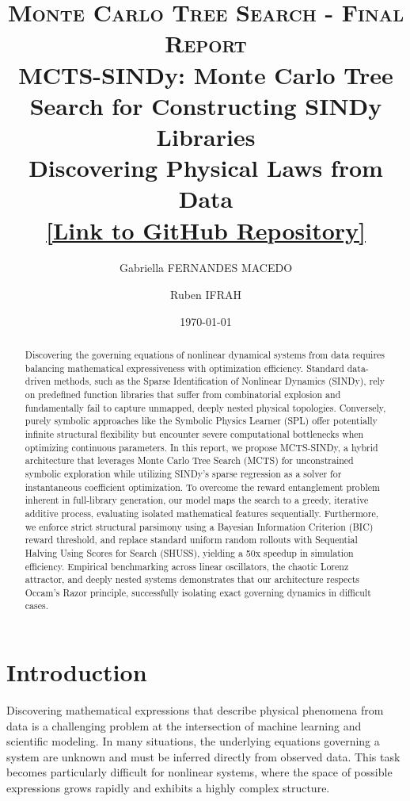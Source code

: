 \documentclass[11pt, a4paper]{article}
\title{
    \textsc{\large Monte Carlo Tree Search - Final Report} \\
    \vspace{0.8cm}
    \textbf{MCTS-SINDy: Monte Carlo Tree Search for Constructing SINDy Libraries}\\
    \large Discovering Physical Laws from Data\\
    \vspace{1ex}
\normalsize \href{https://github.com/gabriellafrds/MCTS_Equation_Discovery}{[Link to GitHub Repository]}}
\author[1]{Gabriella FERNANDES MACEDO}
\author[1]{Ruben IFRAH}
\affil[1]{\normalsize Master IASD, Dauphine-PSL}
\date{\today}
\begin{document}
\maketitle

\begin{abstract}
Discovering the governing equations of nonlinear dynamical systems from data requires balancing mathematical expressiveness with optimization efficiency. Standard data-driven methods, such as the Sparse Identification of Nonlinear Dynamics (SINDy), rely on predefined function libraries that suffer from combinatorial explosion and fundamentally fail to capture unmapped, deeply nested physical topologies. Conversely, purely symbolic approaches like the Symbolic Physics Learner (SPL) offer potentially infinite structural flexibility but encounter severe computational bottlenecks when optimizing continuous parameters. In this report, we propose MCTS-SINDy, a hybrid architecture that leverages Monte Carlo Tree Search (MCTS) for unconstrained symbolic exploration while utilizing SINDy's sparse regression as a solver for instantaneous coefficient optimization. To overcome the reward entanglement problem inherent in full-library generation, our model maps the search to a greedy, iterative additive process, evaluating isolated mathematical features sequentially. Furthermore, we enforce strict structural parsimony using a Bayesian Information Criterion (BIC) reward threshold, and replace standard uniform random rollouts with Sequential Halving Using Scores for Search (SHUSS), yielding a 50x speedup in simulation efficiency. Empirical benchmarking across linear oscillators, the chaotic Lorenz attractor, and deeply nested systems demonstrates that our architecture respects Occam's Razor principle, successfully isolating exact governing dynamics in difficult cases.
\end{abstract}

\newpage

\tableofcontents

\newpage

\section{Introduction}

Discovering mathematical expressions that describe physical phenomena from data is a challenging problem at the intersection of machine learning and scientific modeling. In many situations, the underlying equations governing a system are unknown and must be inferred directly from observed data. This task becomes particularly difficult for nonlinear systems, where the space of possible expressions grows rapidly and exhibits a highly complex structure.\\
\end{document}

